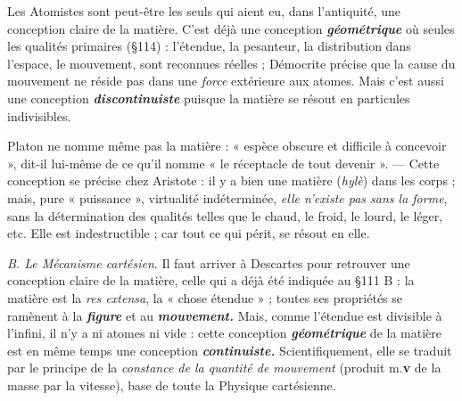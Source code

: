 Les Atomistes sont peut-être les seuls qui aient eu, dans l’antiquité,
une conception claire de la matière. C’est déjà une conception \textbf{\textit {géométrique}}
où seules les qualités primaires (\S 114) : l’étendue, la
pesanteur, la distribution dans l’espace, le mouvement, sont reconnues
réelles ; Démocrite précise que la cause du mouvement ne
réside pas dans une {\it force} extérieure aux atomes. Mais c’est aussi une
conception \textbf{\textit {discontinuiste}} puisque la matière se résout en particules
indivisibles.

\vspace{0.24cm}
{\footnotesize Platon ne nomme même pas la matière : « espèce obscure et difficile
à concevoir », dit-il lui-même de ce qu’il nomme « le réceptacle de tout
devenir ». — Cette conception se précise chez Aristote : il y a bien une
matière ({\it hylè}) dans les corps ; mais, pure « puissance », virtualité indéterminée,
{\it elle n'existe pas sans la forme}, sans la détermination des qualités
telles que le chaud, le froid, le lourd, le léger, etc. Elle est indestructible ;
car tout ce qui périt, se résout en elle.}
\vspace{0.31cm}

{\it B. Le Mécanisme cartésien}. Il faut arriver à Descartes pour
retrouver une conception claire de la matière, celle qui a déjà été
indiquée au \S 111 B : la matière est la {\it res extensa}, la « chose étendue » ;
toutes ses propriétés se ramènent à la
\textbf{\textit {figure}} et au \textbf{\textit {mouvement.}} Mais,
comme l’étendue est divisible à l'infini, il n’y a ni atomes ni vide :
cette conception \textbf{\textit {géométrique}} de la matière est en même temps une
conception \textbf{\textit {continuiste.}} Scientifiquement, elle se traduit par le principe
de la {\it constance de la quantité de mouvement} (produit m.{\bf v} de
la masse par la vitesse), base de toute la Physique cartésienne.

